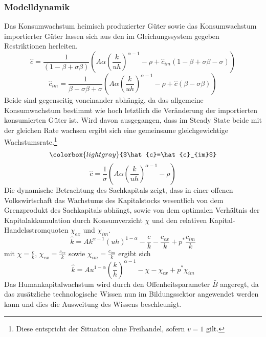 \subsubsection*{Modelldynamik}
Das Konsumwachstum heimisch produzierter Güter sowie das Konsumwachstum importierter Güter lassen sich aus den im Gleichungssystem gegeben Restriktionen herleiten.
\begin{equation}
\hat{c}=\frac{1}{(1-\beta+\sigma\beta)}\left(A\alpha \left(\frac{k}{uh}\right)^{\alpha -1}-\rho+\hat{c}_{im}(1-\beta+\sigma\beta-\sigma)\right)
\end{equation}
\begin{equation}
\hat{c}_{im}=\frac{1}{\beta-\sigma\beta+ \sigma}\left(A\alpha \left(\frac{k}{uh}\right)^{\alpha -1}-\rho+\hat{c}(\beta - \sigma\beta)\right)
\end{equation}
Beide sind gegenseitig voneinander abhängig, da das allgemeine Konsumwachstum bestimmt wie hoch letztlich die Veränderung der importierten konsumierten Güter ist. Wird davon ausgegangen, dass im Steady State beide mit der gleichen Rate wachsen ergibt sich eine gemeinsame gleichgewichtige Wachstumsrate.\footnote{Diese entspricht der Situation ohne Freihandel, sofern $v=1$ gilt.}
\begin{equation*}
\colorbox{lightgray}{$\hat{c}=\hat{c}_{im}$}
\end{equation*}
\vspace{-0.5cm}
\begin{equation}
\hat{c}=\frac{1}{\sigma}\left(A\alpha \left(\frac{k}{uh}\right)^{\alpha-1}-\rho\right)
\end{equation}
Die dynamische Betrachtung des Sachkapitals zeigt, dass in einer offenen Volkswirtschaft das Wachstums des Kapitalstocks wesentlich von dem Grenzprodukt des Sachkapitals abhängt, sowie von dem optimalen Verhältnis der Kapitalakkumulation durch Konsumverzicht $\chi$ und den relativen Kapital-Handelsstromquoten $\chi_{ex}$ und $\chi_{im}$. 
\begin{equation*}
\hat{k}=A k^{\alpha-1}(uh)^{1-\alpha}-\frac{c}{k}-\frac{c_{ex}}{k}+p^*\frac{c_{im}}{k}
\end{equation*}
mit $\chi=\frac{c}{k}$, $\chi_{ex}=\frac{c_{ex}}{k}$ sowie $\chi_{im}=\frac{c_{im}}{k}$ ergibt sich
\begin{equation}
\boxed{\hat{k}=A u^{1-\alpha}\left(\frac{k}{h}\right)^{\alpha-1}-\chi-\chi_{ex}+p^*\chi_{im}}
\end{equation}
Das Humankapitalwachstum wird durch den Offenheitsparameter $\bar{B}$ angeregt, da das zusätzliche technologische Wissen nun im Bildungssektor angewendet werden kann und dies die Ausweitung des Wissens beschleunigt.
